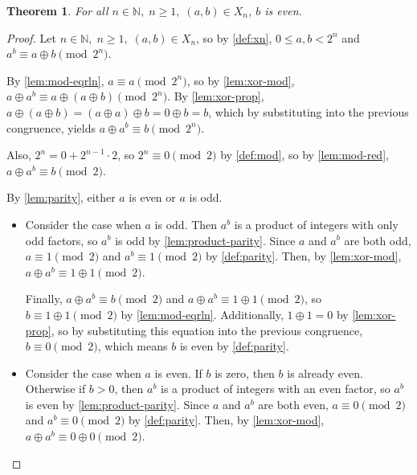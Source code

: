 \documentclass[1gpt]{article}
\theoremstyle{break}
\newtheorem{theorem}{Theorem}[section]
\newcommand{\xor}{\oplus}
\begin{document}
\begin{theorem}
    \label{thm:b-even}
    For all $n \in \mathbb{N},\; n \geq 1,\; (a, b) \in X_n$, $b$ is even.
\end{theorem}

\begin{proof}

    Let $n \in \mathbb{N},\; n \geq 1,\; (a, b) \in X_n$, so by \ref{def:xn},
    $0 \leq a, b < 2^n$ and $a^b \equiv a \xor b \pmod{2^n}$.

    By \ref{lem:mod-eqrln}, $a \equiv a \pmod{2^n}$, so by \ref{lem:xor-mod},
    $a \xor a^b \equiv a \xor (a \xor b) \pmod{2^n}$. By \ref{lem:xor-prop},
    $a \xor (a \xor b) = (a \xor a) \xor b = 0 \xor b = b$, which by
    substituting into the previous congruence, yields $a \xor a^b \equiv b
    \pmod{2^n}$.

    Also, $2^n = 0 + 2^{n-1} \cdot 2$, so $2^n \equiv 0 \pmod{2}$ by
    \ref{def:mod}, so by \ref{lem:mod-red}, $a \xor a^b \equiv b \pmod{2}$.

    By \ref{lem:parity}, either $a$ is even or $a$ is odd.

    \begin{itemize}

        \item

            Consider the case when $a$ is odd. Then $a^b$ is a product of
            integers with only odd factors, so $a^b$ is odd by
            \ref{lem:product-parity}. Since $a$ and $a^b$ are both odd, $a
            \equiv 1 \pmod{2}$ and $a^b \equiv 1 \pmod{2}$ by \ref{def:parity}.
            Then, by \ref{lem:xor-mod}, $a \xor a^b \equiv 1 \xor 1 \pmod{2}$.

            Finally, $a \xor a^b \equiv b \pmod{2}$ and $a \xor a^b \equiv 1
            \xor 1 \pmod{2}$, so $b \equiv 1 \xor 1 \pmod{2}$ by
            \ref{lem:mod-eqrln}. Additionally, $1 \xor 1 = 0$ by
            \ref{lem:xor-prop}, so by substituting this equation into the
            previous congruence, $b \equiv 0 \pmod{2}$, which means $b$ is even
            by \ref{def:parity}.

        \item

            Consider the case when $a$ is even. If $b$ is zero, then $b$ is
            already even. Otherwise if $b > 0$, then $a^b$ is a product of
            integers with an even factor, so $a^b$ is even by
            \ref{lem:product-parity}. Since $a$ and $a^b$ are both even, $a
            \equiv 0 \pmod{2}$ and $a^b \equiv 0 \pmod{2}$ by \ref{def:parity}.
            Then, by \ref{lem:xor-mod}, $a \xor a^b \equiv 0 \xor 0 \pmod{2}$.


\end{itemize}
\end{proof}
\end{document}
